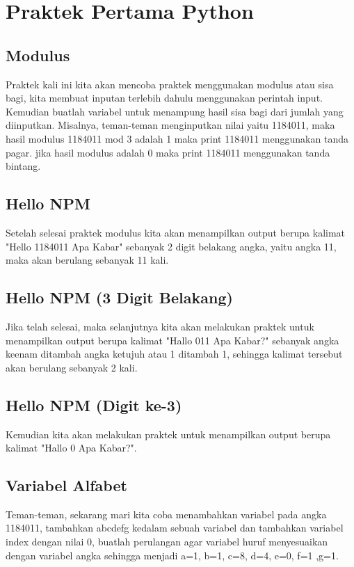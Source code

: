 \section{Praktek Pertama Python}
\subsection{Modulus}
Praktek kali ini kita akan mencoba praktek menggunakan modulus atau sisa bagi, kita membuat inputan terlebih dahulu menggunakan perintah input. Kemudian buatlah variabel untuk menampung hasil sisa bagi dari jumlah yang diinputkan. Misalnya, teman-teman menginputkan nilai yaitu 1184011, maka hasil modulus 1184011 mod 3 adalah 1 maka print 1184011 menggunakan tanda pagar. jika hasil modulus adalah 0 maka print 1184011 menggunakan tanda bintang.

\subsection{Hello NPM}
Setelah selesai praktek modulus kita akan menampilkan output berupa kalimat "Hello 1184011 Apa Kabar" sebanyak 2 digit belakang angka, yaitu angka 11, maka akan berulang sebanyak 11 kali.

\subsection{Hello NPM (3 Digit Belakang)}
Jika telah selesai, maka selanjutnya kita akan melakukan praktek untuk menampilkan output berupa kalimat "Hallo 011 Apa Kabar?" sebanyak angka keenam ditambah angka ketujuh atau 1 ditambah 1, sehingga kalimat tersebut akan berulang sebanyak 2 kali.

\subsection{Hello NPM (Digit ke-3)}
Kemudian kita akan melakukan praktek untuk menampilkan output berupa kalimat "Hallo 0 Apa Kabar?".

\subsection{Variabel Alfabet}
Teman-teman, sekarang mari kita coba menambahkan variabel pada angka 1184011, tambahkan abcdefg kedalam sebuah variabel dan tambahkan variabel index dengan nilai 0, buatlah perulangan agar variabel huruf menyesuaikan dengan variabel angka sehingga menjadi a=1, b=1, c=8, d=4, e=0, f=1 ,g=1.

